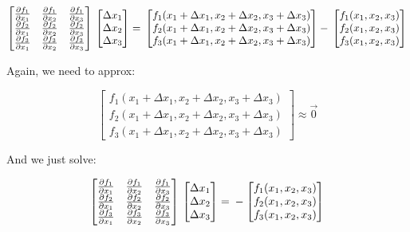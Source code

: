 \documentclass[12pt]{article}
\renewcommand{\_}{\kern-1.5pt\textunderscore\kern-1.5pt}
\begin{document}
$$ \begin{bmatrix}
\frac{\partial f_1}{\partial x_1}  & \frac{\partial f_1}{\partial x_2}  & \frac{\partial f_1}{\partial x_3} \\
\frac{\partial f_2}{\partial x_1}  & \frac{\partial f_2}{\partial x_2}  & \frac{\partial f_2}{\partial x_3} \\
\frac{\partial f_3}{\partial x_1}  & \frac{\partial f_3}{\partial x_2}  & \frac{\partial f_3}{\partial x_3} 
\end{bmatrix} \\ 
\begin{bmatrix}
\Delta x_1 \\
\Delta x_2 \\
\Delta x_3
\end{bmatrix} = \\
\begin{bmatrix}
f_1 (x_1+\Delta x_1,x_2+\Delta x_2 , x_3+\Delta x_3) \\
f_2 (x_1+\Delta x_1,x_2+\Delta x_2 , x_3+\Delta x_3) \\
f_3 (x_1+\Delta x_1,x_2+\Delta x_2 , x_3+\Delta x_3)
\end{bmatrix} - \\
\begin{bmatrix}
f_1 (x_1,x_2,x_3) \\
f_2 (x_1,x_2,x_3) \\
f_3 (x_1,x_2,x_3)
\end{bmatrix}
$$

Again, we need to approx:

$$\begin{bmatrix}
f_1 (x_1+\Delta x_1,x_2+\Delta x_2 , x_3+\Delta x_3) \\
f_2 (x_1+\Delta x_1,x_2+\Delta x_2 , x_3+\Delta x_3) \\
f_3 (x_1+\Delta x_1,x_2+\Delta x_2 , x_3+\Delta x_3)
\end{bmatrix} \approx \vec{0}$$

And we just solve:

$$ \begin{bmatrix}
\frac{\partial f_1}{\partial x_1}  & \frac{\partial f_1}{\partial x_2}  & \frac{\partial f_1}{\partial x_3} \\
\frac{\partial f_2}{\partial x_1}  & \frac{\partial f_2}{\partial x_2}  & \frac{\partial f_2}{\partial x_3} \\
\frac{\partial f_3}{\partial x_1}  & \frac{\partial f_3}{\partial x_2}  & \frac{\partial f_3}{\partial x_3} 
\end{bmatrix} \\ 
\begin{bmatrix}
\Delta x_1 \\
\Delta x_2 \\
\Delta x_3
\end{bmatrix} = \\
-\begin{bmatrix}
f_1 (x_1,x_2,x_3) \\
f_2 (x_1,x_2,x_3) \\
f_3 (x_1,x_2,x_3)
\end{bmatrix}
$$
\end{document}
